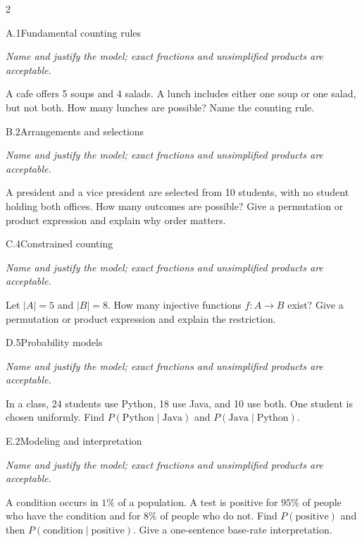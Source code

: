 \documentclass[9pt]{extarticle}
\begin{document}
\CoreWorkArea
\FormBreak
{}
\begin{multicols}{2}
\begin{CoreProblem}{A.1}{Fundamental counting rules}
{\scriptsize\textit{Name and justify the model; exact fractions and unsimplified products are acceptable.}\par}
A cafe offers 5 soups and 4 salads. A lunch includes either one soup
    or one salad, but not both. How many lunches are possible? Name the counting
    rule.
\end{CoreProblem}
\begin{CoreProblem}{B.2}{Arrangements and selections}
{\scriptsize\textit{Name and justify the model; exact fractions and unsimplified products are acceptable.}\par}
A president and a vice president are selected from 10 students, with
    no student holding both offices. How many outcomes are possible? Give a
    permutation or product expression and explain why order matters.
\end{CoreProblem}
\begin{CoreProblem}{C.4}{Constrained counting}
{\scriptsize\textit{Name and justify the model; exact fractions and unsimplified products are acceptable.}\par}
Let $|A|=5$ and $|B|=8$. How many injective functions $f:A\to B$
    exist? Give a permutation or product expression and explain the restriction.
\end{CoreProblem}
\columnbreak
\begin{CoreProblem}{D.5}{Probability models}
{\scriptsize\textit{Name and justify the model; exact fractions and unsimplified products are acceptable.}\par}
In a class, 24 students use Python, 18 use Java, and 10 use both.
    One student is chosen uniformly. Find
    $P(\text{Python}\mid\text{Java})$ and
    $P(\text{Java}\mid\text{Python})$.
\end{CoreProblem}
\begin{CoreProblem}{E.2}{Modeling and interpretation}
{\scriptsize\textit{Name and justify the model; exact fractions and unsimplified products are acceptable.}\par}
A condition occurs in $1\%$ of a population. A test is positive for
    $95\%$ of people who have the condition and for $8\%$ of people who do not.
    Find $P(\text{positive})$ and then
    $P(\text{condition}\mid\text{positive})$. Give a one-sentence base-rate
    interpretation.
\end{CoreProblem}
\end{multicols}
\end{document}
